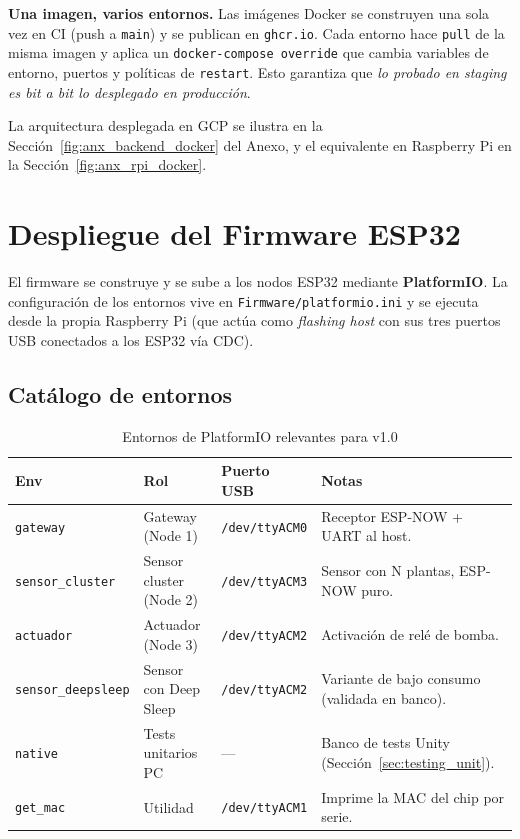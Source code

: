 \begin{designnote}
\textbf{Una imagen, varios entornos.} Las imágenes Docker se construyen una sola vez
en CI (push a \texttt{main}) y se publican en \texttt{ghcr.io}. Cada entorno hace
\texttt{pull} de la misma imagen y aplica un \texttt{docker-compose override} que
cambia variables de entorno, puertos y políticas de \texttt{restart}. Esto garantiza
que \textit{lo probado en staging es bit a bit lo desplegado en producción}.
\end{designnote}

La arquitectura desplegada en GCP se ilustra en la
Sección~\ref{fig:anx_backend_docker} del Anexo, y el equivalente en Raspberry Pi en
la Sección~\ref{fig:anx_rpi_docker}.

\section{Despliegue del Firmware ESP32}
\label{sec:despliegue_firmware}

El firmware se construye y se sube a los nodos ESP32 mediante \textbf{PlatformIO}. La
configuración de los entornos vive en \texttt{Firmware/platformio.ini} y se ejecuta
desde la propia Raspberry Pi (que actúa como \textit{flashing host} con sus tres
puertos USB conectados a los ESP32 vía CDC).

\subsection{Catálogo de entornos}

\begin{table}[H]
    \centering
    \caption{Entornos de PlatformIO relevantes para v1.0}
    \begin{tabularx}{\textwidth}{lllX}
        \toprule
        \textbf{Env}                & \textbf{Rol}              & \textbf{Puerto USB}     & \textbf{Notas} \\
        \midrule
        \texttt{gateway}            & Gateway (Node 1)          & \texttt{/dev/ttyACM0}    & Receptor ESP-NOW + UART al host. \\
        \texttt{sensor\_cluster}    & Sensor cluster (Node 2)   & \texttt{/dev/ttyACM3}    & Sensor con N plantas, ESP-NOW puro. \\
        \texttt{actuador}           & Actuador (Node 3)         & \texttt{/dev/ttyACM2}    & Activación de relé de bomba. \\
        \texttt{sensor\_deepsleep}  & Sensor con Deep Sleep     & \texttt{/dev/ttyACM2}    & Variante de bajo consumo (validada en banco). \\
        \texttt{native}             & Tests unitarios PC        & ---                      & Banco de tests Unity (Sección~\ref{sec:testing_unit}). \\
        \texttt{get\_mac}           & Utilidad                  & \texttt{/dev/ttyACM1}    & Imprime la MAC del chip por serie. \\
        \bottomrule
    \end{tabularx}
    \label{tab:pio_envs}
\end{table}

